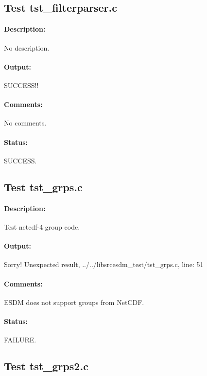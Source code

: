 \subsection{Test tst\_filterparser.c}

\paragraph{Description:} No description.

\paragraph{Output:} SUCCESS!!

\paragraph{Comments:} No comments.

\paragraph{Status:} SUCCESS.

\subsection{Test tst\_grps.c}

\paragraph{Description:} Test netcdf-4 group code.

\paragraph{Output:} Sorry! Unexpected result, ../../libsrcesdm\_test/tst\_grps.c, line: 51

\paragraph{Comments:} ESDM does not support groups from NetCDF.

\paragraph{Status:} FAILURE.

\subsection{Test tst\_grps2.c}

